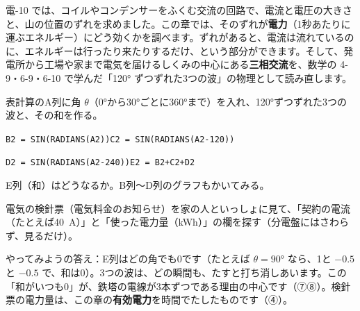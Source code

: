 \noindent 電-10 では、コイルやコンデンサーをふくむ交流の回路で、電流と電圧の大きさと、山の位置のずれを求めました。この章では、そのずれが\textbf{電力}（1秒あたりに運ぶエネルギー）にどう効くかを調べます。ずれがあると、電流は流れているのに、エネルギーは行ったり来たりするだけ、という部分ができます。そして、発電所から工場や家まで電気を届けるしくみの中心にある\textbf{三相交流}を、数学の 4-9・6-9・6-10 で学んだ「120° ずつずれた3つの波」の物理として読み直します。

\begin{yattemiyou}
\begin{enumerate}[label={\bkcircled[bkGreen]{\arabic*}}, leftmargin=2.4\zw, itemsep=1pt, topsep=0pt]
\item 表計算のA列に角 $\theta$（0°から30°ごとに360°まで）を入れ、120°ずつずれた3つの波と、その和を作る。\par
{\small\texttt{B2 = SIN(RADIANS(A2))}\quad\texttt{C2 = SIN(RADIANS(A2-120))}\par
\texttt{D2 = SIN(RADIANS(A2-240))}\quad\texttt{E2 = B2+C2+D2}}
\item E列（和）はどうなるか。B列〜D列のグラフもかいてみる。
\item 電気の検針票（電気料金のお知らせ）を家の人といっしょに見て、「契約の電流（たとえば\qty{40}{A}）」と「使った電力量（kWh）」の欄を探す（分電盤にはさわらず、見るだけ）。
\end{enumerate}
\end{yattemiyou}

\noindent やってみようの答え：E列はどの角でも0です（たとえば $\theta=90°$ なら、1と $-0.5$ と $-0.5$ で、和は0）。3つの波は、どの瞬間も、たすと打ち消しあいます。この「和がいつも0」が、鉄塔の電線が3本ずつである理由の中心です（⑦⑧）。検針票の電力量は、この章の\textbf{有効電力}を時間でたしたものです（④）。

\begin{omoidasou}
\end{omoidasou}

